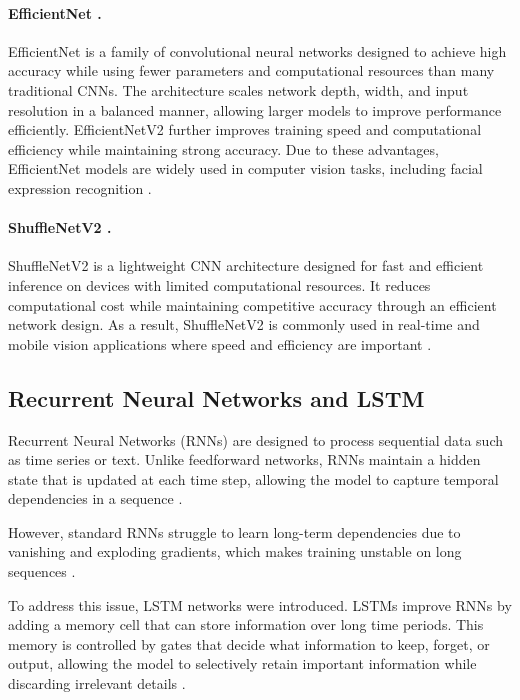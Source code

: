 \paragraph{EfficientNet \cite{tan_efficientnet_2019,tan_efficientnetv2_2021}.}
EfficientNet is a family of convolutional neural networks designed to achieve high accuracy while using fewer parameters and computational resources than many traditional \ac{CNN}s. The architecture scales network depth, width, and input resolution in a balanced manner, allowing larger models to improve performance efficiently. EfficientNetV2 further improves training speed and computational efficiency while maintaining strong accuracy. Due to these advantages, EfficientNet models are widely used in computer vision tasks, including facial expression recognition \cite{tan_efficientnet_2019,tan_efficientnetv2_2021}.

\paragraph{ShuffleNetV2 \cite{ma_shufflenetv2_2018}.}
ShuffleNetV2 is a lightweight \ac{CNN} architecture designed for fast and efficient inference on devices with limited computational resources. It reduces computational cost while maintaining competitive accuracy through an efficient network design. As a result, ShuffleNetV2 is commonly used in real-time and mobile vision applications where speed and efficiency are important \cite{ma_shufflenetv2_2018}.
\subsection{Recurrent Neural Networks and \ac{LSTM}}\label{sec:bg:rnn}

Recurrent Neural Networks (RNNs) are designed to process sequential data such as time series or text. Unlike feedforward networks, RNNs maintain a hidden state that is updated at each time step, allowing the model to capture temporal dependencies in a sequence \cite{hochreiter_lstm_1997}.

However, standard RNNs struggle to learn long-term dependencies due to vanishing and exploding gradients, which makes training unstable on long sequences \cite{hochreiter_lstm_1997}.

To address this issue, \ac{LSTM} networks were introduced. \ac{LSTM}s improve RNNs by adding a memory cell that can store information over long time periods. This memory is controlled by gates that decide what information to keep, forget, or output, allowing the model to selectively retain important information while discarding irrelevant details \cite{hochreiter_lstm_1997}.

